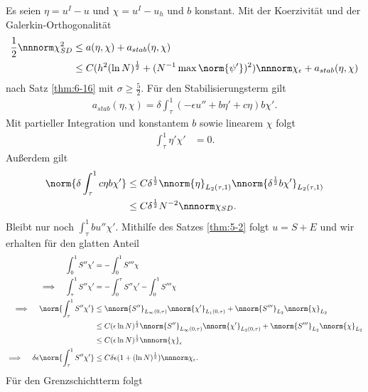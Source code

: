 \begin{beweis}
  Es seien $\eta = u^{I} - u$ und $\chi = u^{I} - u_{h}$ und $b$ konstant. Mit der Koerzivität und der Galerkin-Orthogonalität
  \begin{align*}
    \frac 12\nnnorm \chi_{SD}^{2} &\leq a (\eta, \chi) + a_{stab}(\eta, \chi)\\
    & \leq C (h^{2} (\ln N)^{\frac 12} + (N^{-1} \max \norm {\psi'})^{2})\nnnorm \chi_{\epsilon} + a_{stab}(\eta, \chi)
  \end{align*}
  nach Satz \ref{thm:6-16} mit $\sigma \geq \frac 52$. Für den Stabilisierungsterm gilt
  \begin{align*}
    a_{stab}(\eta, \chi) = \delta \int_{\tau}^{1}(-\epsilon u'' + b \eta' + c \eta)b \chi'. 
  \end{align*}
Mit partieller Integration und konstantem $b$ sowie linearem $\chi$ folgt
\begin{align*}
  \int_{\tau}^{1} \eta' \chi' &=0.  
\end{align*}
Außerdem gilt
\begin{align*}
  \norm{\delta \int_{\tau}^{1} c \eta b \chi'} &\leq C \delta^{\frac 12} \nnorm{\eta}_{L_{2}(\tau, 1)} \nnorm{\delta^{\frac 12} b \chi'}_{L_{2}(\tau, 1)}\\
& \leq C \delta^{ \frac 12} N^{-2} \nnnorm \chi_{SD}. 
\end{align*}
Bleibt nur noch $\int_{\tau}^{1} b u'' \chi'$. Mithilfe des Satzes \ref{thm:5-2} folgt $u = S + E$ und wir erhalten für den glatten Anteil
\begin{align*}
  \int_{0}^{1} S'' \chi' &= - \int_{0}^{1} S''' \chi \\
\implies \quad \int_{\tau}^{1} S'' \chi' &= - \int_{0}^{\tau} S'' \chi' - \int_{0}^{1} S'''\chi \\
\implies \quad \norm{\int_{\tau}^{1} S'' \chi'} &\leq \nnorm{S''}_{L_{\infty}(0, \tau)} \nnorm{\chi'}_{L_{1}(0, \tau)} + \nnorm{S'''}_{L_{2}} \nnorm {\chi}_{L_{2}}\\
&\leq C(\epsilon \ln N)^{\frac 12} \nnorm{S''}_{L_{\infty}(0, \tau)} \nnorm{\chi'}_{L_{2}(0, \tau)} + \nnorm{S'''}_{L_{2}} \nnorm {\chi}_{L_{2}}\\
&\leq C(\epsilon \ln N)^{\frac 12} \nnnorm{\chi}_{\epsilon}\\
\implies \quad  \delta\epsilon \norm{\int_{\tau}^{1} S'' \chi'} & \leq C \delta \epsilon(1 + (\ln N)^{\frac 12}) \nnnorm \chi_{\epsilon}. 
\end{align*}
Für den Grenzschichtterm folgt
\begin{align*}

\end{align*}
\end{beweis}
